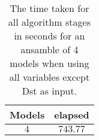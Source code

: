 \begin{table}[!ht]
	\centering
	\begin{tabular}{|c|c|}
		\hline
		Models & elapsed \\ \hline
		$4$ & $743.77$ \\ \hline
	\end{tabular}
	\caption{The time taken for all algorithm stages in seconds for an ansamble of 4 models when using all variables except Dst as input.}
	\label{tab:time:ansamble:noDst:4}
\end{table}

